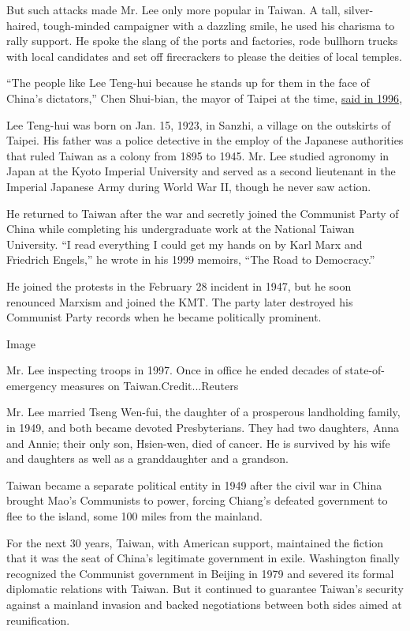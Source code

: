 But such attacks made Mr. Lee only more popular in Taiwan. A tall,
silver-haired, tough-minded campaigner with a dazzling smile, he used
his charisma to rally support. He spoke the slang of the ports and
factories, rode bullhorn trucks with local candidates and set off
firecrackers to please the deities of local temples.

``The people like Lee Teng-hui because he stands up for them in the face
of China's dictators,'' Chen Shui-bian, the mayor of Taipei at the time,
\href{https://www.nytimes.com/1996/03/22/world/tension-in-taiwan-the-politics-war-games-play-well-for-taiwan-s-leader.html}{said
in 1996},

Lee Teng-hui was born on Jan. 15, 1923, in Sanzhi, a village on the
outskirts of Taipei. His father was a police detective in the employ of
the Japanese authorities that ruled Taiwan as a colony from 1895 to
1945. Mr. Lee studied agronomy in Japan at the Kyoto Imperial University
and served as a second lieutenant in the Imperial Japanese Army during
World War II, though he never saw action.

He returned to Taiwan after the war and secretly joined the Communist
Party of China while completing his undergraduate work at the National
Taiwan University. ``I read everything I could get my hands on by Karl
Marx and Friedrich Engels,'' he wrote in his 1999 memoirs, ``The Road to
Democracy.''

He joined the protests in the February 28 incident in 1947, but he soon
renounced Marxism and joined the KMT. The party later destroyed his
Communist Party records when he became politically prominent.

Image

Mr. Lee inspecting troops in 1997. Once in office he ended decades of
state-of-emergency measures on Taiwan.Credit...Reuters

Mr. Lee married Tseng Wen-fui, the daughter of a prosperous landholding
family, in 1949, and both became devoted Presbyterians. They had two
daughters, Anna and Annie; their only son, Hsien-wen, died of cancer. He
is survived by his wife and daughters as well as a granddaughter and a
grandson.

Taiwan became a separate political entity in 1949 after the civil war in
China brought Mao's Communists to power, forcing Chiang's defeated
government to flee to the island, some 100 miles from the mainland.

For the next 30 years, Taiwan, with American support, maintained the
fiction that it was the seat of China's legitimate government in exile.
Washington finally recognized the Communist government in Beijing in
1979 and severed its formal diplomatic relations with Taiwan. But it
continued to guarantee Taiwan's security against a mainland invasion and
backed negotiations between both sides aimed at reunification.

